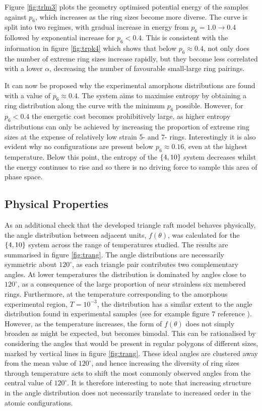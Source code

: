 Figure \ref{fig:trlm3} plots the geometry optimised potential energy of the samples against $p_6$, which increases as the ring sizes become more diverse. 
The curve is split into two regimes, with gradual increase in energy from $p_6=1.0\rightarrow 0.4$ followed by exponential increase for $p_6<0.4$. 
This is consistent with the information in figure \ref{fig:trpk4} which shows that below $p_6\approx 0.4$, not only does the number of extreme ring sizes increase rapidly, but they become less correlated with a lower $\alpha$, decreasing the number of favourable small\--large ring pairings.

It can now be proposed why the experimental amorphous distributions are found with a value of $p_6\approx 0.4$. 
The system aims to maximise entropy by obtaining a ring distribution along the \lm{} curve with the minimum $p_6$ possible. 
However, for $p_6<0.4$ the energetic cost becomes prohibitively large, as higher entropy distributions can only be achieved by increasing the proportion of extreme ring sizes at the expense of relatively low strain 5- and 7- rings.
Interestingly it is also evident why no configurations are present below $p_6\approx 0.16$, even at the highest temperature.
Below this point, the entropy of the $\left\{4,10\right\}$ system decreases whilst the energy continues to rise and so there is no driving force to sample this area of phase space.

\subsection{Physical Properties}
\label{s:trphysprop}

As an additional check that the developed triangle raft model behaves physically, 
the angle distribution between adjacent \sioiii{} units, $f\left(\theta\right)$, was calculated for the $\left\{4,10\right\}$ system across the range of temperatures studied. 
The results are summarised in figure \ref{fig:trang}. 
The angle distributions are necessarily symmetric about $120^\circ$, as each triangle pair contributes two complementary angles. 
At lower temperatures the distribution is dominated by angles close to $120^\circ$, as a consequence of the large proportion of near strainless six membered rings.
Furthermore, at the temperature corresponding to the amorphous experimental region, $T=10^{-3}$, the distribution has a similar extent to the angle distribution found in experimental samples (see for example figure 7 reference \cite{Roy2018}). 
However, as the temperature increases, the form of $f\left(\theta\right)$ does not simply broaden as might be expected, but becomes bimodal. 
This can be rationalised by considering the angles that would be present in regular polygons of different sizes, marked by vertical lines in figure \ref{fig:trang}.  These ideal angles are clustered away from the mean value of $120^\circ$, and hence increasing the diversity of ring sizes through temperature acts to shift the most commonly observed angles from the central value of $120^\circ$. 
It is therefore interesting to note that increasing structure in the angle distribution does not necessarily translate to increased order in the atomic configurations.

